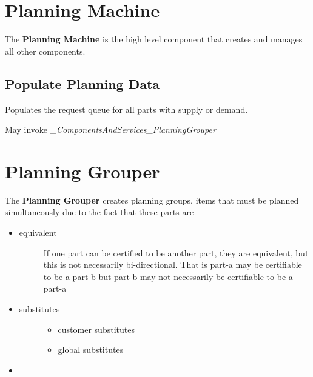 \documentclass[letterpaper,10pt,english]{sphinxmanual}
\begin{document}
\section{Planning Machine}
\label{APS/ComponentsAndServices:planning-machine}
The \textbf{Planning Machine} is the high level component that creates and manages all other components.


\subsection{Populate Planning Data}
\label{APS/ComponentsAndServices:populate-planning-data}
Populates the request queue for all parts with supply or demand.

May invoke \emph{\_ComponentsAndServices\_PlanningGrouper}


\section{Planning Grouper}
\label{APS/ComponentsAndServices:componentsandservices-planninggrouper}\label{APS/ComponentsAndServices:planning-grouper}
The \textbf{Planning Grouper} creates planning groups, items that must be planned simultaneously due
to the fact that these parts are
\begin{itemize}
\item {} \begin{description}
\item[{equivalent}] \leavevmode
If one part can be certified to be another part, they are equivalent, but this is not necessarily
bi-directional. That is part-a may be certifiable to be a part-b but part-b may not necessarily
be certifiable to be a part-a

\end{description}

\item {} \begin{description}
\item[{substitutes}] \leavevmode\begin{itemize}
\item {} 
customer substitutes

\item {} 
global substitutes

\end{itemize}

\end{description}

\item {} 
\end{itemize}
\end{document}
